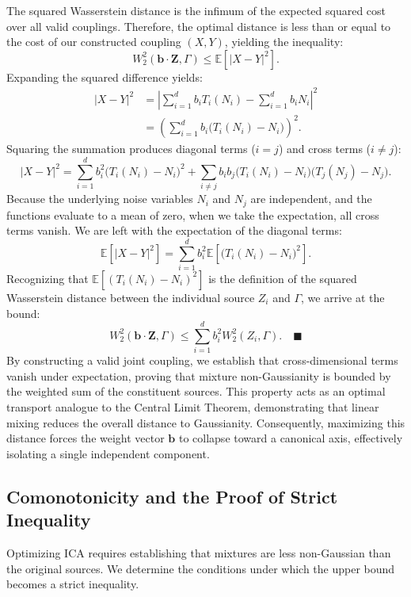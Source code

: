 \documentclass[12pt,a4paper,twoside,openany]{book}
\begin{document}
The squared Wasserstein distance is the infimum of the expected squared cost over all valid couplings. 
Therefore, the optimal distance is less than or equal to the cost of our constructed coupling $(X, Y)$, yielding the inequality:
\begin{equation}
    W_2^2(\mathbf{b} \cdot \mathbf{Z}, \Gamma) \le \mathbb{E}\left[|X - Y|^2\right].
\end{equation}
Expanding the squared difference yields:
\begin{align}
    |X - Y|^2 &= \left| \sum_{i=1}^d b_i T_i(N_i) - \sum_{i=1}^d b_i N_i \right|^2 \nonumber \\
              &= \left( \sum_{i=1}^d b_i \big(T_i(N_i) - N_i\big) \right)^2.
\end{align}
Squaring the summation produces diagonal terms ($i=j$) and cross terms ($i \neq j$):
\begin{equation}
    |X - Y|^2 = \sum_{i=1}^d b_i^2 \big(T_i(N_i) - N_i\big)^2 + \sum_{i \neq j} b_i b_j \big(T_i(N_i) - N_i\big)\big(T_j(N_j) - N_j\big).
\end{equation}
Because the underlying noise variables $N_i$ and $N_j$ are independent, 
and the functions evaluate to a mean of zero, when we take the expectation, all cross terms vanish. We are left with the expectation of the diagonal terms:
\begin{equation}
    \mathbb{E}\left[|X - Y|^2\right] = \sum_{i=1}^d b_i^2 \mathbb{E}\left[ \big(T_i(N_i) - N_i\big)^2 \right].
\end{equation}
Recognizing that $\mathbb{E}[ (T_i(N_i) - N_i)^2 ]$ is the definition of the squared Wasserstein distance between 
the individual source $Z_i$ and $\Gamma$, we arrive at the bound:
\begin{equation}
    W_2^2(\mathbf{b} \cdot \mathbf{Z}, \Gamma) \le \sum_{i=1}^d b_i^2 W_2^2(Z_i, \Gamma). \quad \blacksquare
\end{equation}
By constructing a valid joint coupling, we establish that cross-dimensional terms vanish under expectation, 
proving that mixture non-Gaussianity is bounded by the weighted sum of the constituent sources. 
This property acts as an optimal transport analogue to the Central Limit Theorem, demonstrating that linear mixing 
reduces the overall distance to Gaussianity. Consequently, maximizing this distance forces the weight vector $\mathbf{b}$ to collapse toward a canonical axis, 
effectively isolating a single independent component.

\subsection{Comonotonicity and the Proof of Strict Inequality}
Optimizing ICA requires establishing that mixtures are less non-Gaussian than the original sources. 
We determine the conditions under which the upper bound becomes a strict inequality.
\end{document}
